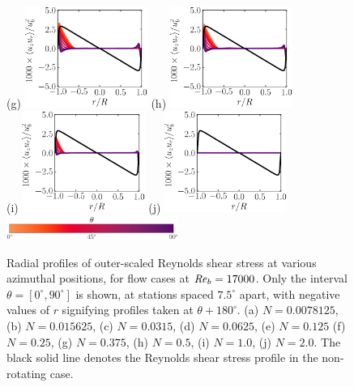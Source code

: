 \documentclass[lineno]{jfm}
\begin{document}
\begin{figure}
               (g) \includegraphics[width=4cm]{Figures/prof_rssouter_rotz0_roty0.1875.eps}
               (h) \includegraphics[width=4cm]{Figures/prof_rssouter_rotz0_roty0.25.eps} \\
               (i) \includegraphics[width=4cm]{Figures/prof_rssouter_rotz0_roty0.5.eps}
               (j) \includegraphics[width=4cm]{Figures/prof_rssouter_rotz0_roty1.0.eps} \\
               \includegraphics[width=0.5\textwidth]{Figures/theta_cmap_half.eps} \\
       \caption{
               Radial profiles of
               outer-scaled Reynolds shear stress
               at various azimuthal positions,
               for flow cases at $\mbox{\textit{Re}}_b=17000$.
               Only the interval $\theta = [0^{\circ},90^{\circ}]$ is shown, at stations
               spaced $7.5^\circ$ apart, with negative values of $r$ signifying profiles
               taken at $\theta + 180^{\circ}$.
               (a) $N = 0.0078125$,
               (b) $N = 0.015625$,
               (c) $N = 0.0315$,
               (d) $N = 0.0625$,
               (e) $N = 0.125$
               (f) $N = 0.25$,
               (g) $N = 0.375$,
               (h) $N = 0.5$,
               (i) $N = 1.0$,
               (j) $N = 2.0$.
	       The black solid line denotes the Reynolds shear stress profile in the
               non-rotating case.
               }
               \label{fig:rss}
       \end{figure}
\end{document}
